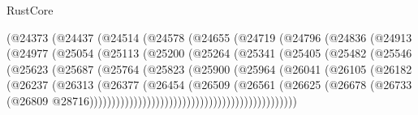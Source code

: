 \begin{lexlean}{RustCore}
\begin{coremodule}
                        (@24373
                          (@24437
                            (@24514
                              (@24578
                                (@24655
                                  (@24719
                                    (@24796
                                      (@24836
                                        (@24913
                                          (@24977
                                            (@25054
                                              (@25113
                                                (@25200
                                                  (@25264
                                                    (@25341
                                                      (@25405
                                                        (@25482
                                                          (@25546
                                                            (@25623
                                                              (@25687
                                                                (@25764
                                                                  (@25823
                                                                    (@25900
                                                                      (@25964
                                                                        (@26041
                                                                          (@26105
                                                                            (@26182
                                                                              (@26237
                                                                                (@26313
                                                                                  (@26377
                                                                                    (@26454
                                                                                      (@26509
                                                                                        (@26561
                                                                                          (@26625
                                                                                            (@26678
                                                                                              (@26733
                                                                                                (@26809
                                                                                                  @28716)))))))))))))))))))))))))))))))))))))))))))))))

\end{coremodule}
\end{lexlean}
